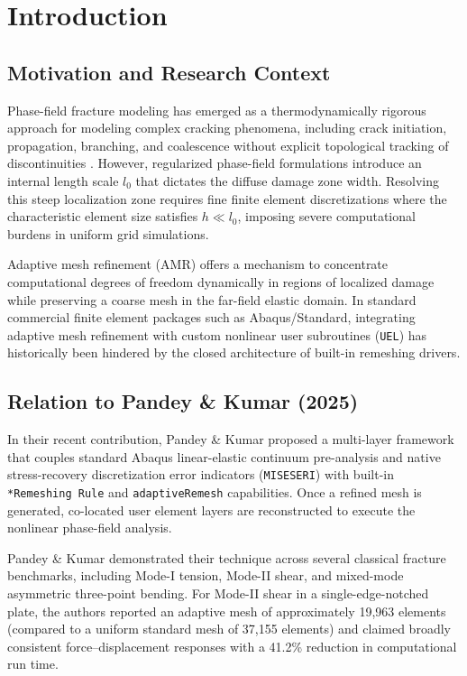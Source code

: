 \documentclass[11pt,a4paper]{article}
\begin{document}
\section{Introduction}

\subsection{Motivation and Research Context}
Phase-field fracture modeling has emerged as a thermodynamically rigorous approach for modeling complex cracking phenomena, including crack initiation, propagation, branching, and coalescence without explicit topological tracking of discontinuities \cite{bourdin2000numerical,miehe2010phase,ambati2015review}. However, regularized phase-field formulations introduce an internal length scale $l_0$ that dictates the diffuse damage zone width. Resolving this steep localization zone requires fine finite element discretizations where the characteristic element size satisfies $h \ll l_0$, imposing severe computational burdens in uniform grid simulations.

Adaptive mesh refinement (AMR) offers a mechanism to concentrate computational degrees of freedom dynamically in regions of localized damage while preserving a coarse mesh in the far-field elastic domain. In standard commercial finite element packages such as Abaqus/Standard, integrating adaptive mesh refinement with custom nonlinear user subroutines (\texttt{UEL}) has historically been hindered by the closed architecture of built-in remeshing drivers.

\subsection{Relation to Pandey \& Kumar (2025)}
In their recent contribution, Pandey \& Kumar \cite{pandey2025adaptive} proposed a multi-layer framework that couples standard Abaqus linear-elastic continuum pre-analysis and native stress-recovery discretization error indicators (\texttt{MISESERI}) with built-in \texttt{*Remeshing Rule} and \texttt{adaptiveRemesh} capabilities. Once a refined mesh is generated, co-located user element layers are reconstructed to execute the nonlinear phase-field analysis.

Pandey \& Kumar demonstrated their technique across several classical fracture benchmarks, including Mode-I tension, Mode-II shear, and mixed-mode asymmetric three-point bending. For Mode-II shear in a single-edge-notched plate, the authors reported an adaptive mesh of approximately 19,963 elements (compared to a uniform standard mesh of 37,155 elements) and claimed broadly consistent force--displacement responses with a 41.2\% reduction in computational run time.
\end{document}
